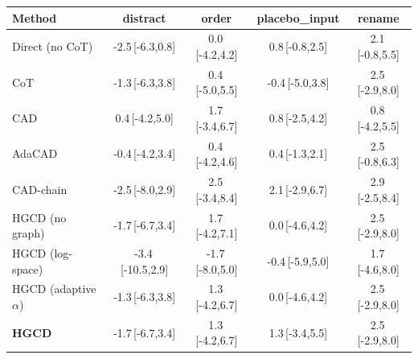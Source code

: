 \begin{tabular}{lcccc}
\toprule
Method & distract & order & placebo\_input & rename \\
\midrule
Direct (no CoT) & -2.5\,{\scriptsize[-6.3,0.8]} & 0.0\,{\scriptsize[-4.2,4.2]} & 0.8\,{\scriptsize[-0.8,2.5]} & 2.1\,{\scriptsize[-0.8,5.5]} \\
CoT & -1.3\,{\scriptsize[-6.3,3.8]} & 0.4\,{\scriptsize[-5.0,5.5]} & -0.4\,{\scriptsize[-5.0,3.8]} & 2.5\,{\scriptsize[-2.9,8.0]} \\
CAD & 0.4\,{\scriptsize[-4.2,5.0]} & 1.7\,{\scriptsize[-3.4,6.7]} & 0.8\,{\scriptsize[-2.5,4.2]} & 0.8\,{\scriptsize[-4.2,5.5]} \\
AdaCAD & -0.4\,{\scriptsize[-4.2,3.4]} & 0.4\,{\scriptsize[-4.2,4.6]} & 0.4\,{\scriptsize[-1.3,2.1]} & 2.5\,{\scriptsize[-0.8,6.3]} \\
CAD-chain & -2.5\,{\scriptsize[-8.0,2.9]} & 2.5\,{\scriptsize[-3.4,8.4]} & 2.1\,{\scriptsize[-2.9,6.7]} & 2.9\,{\scriptsize[-2.5,8.4]} \\
HGCD (no graph) & -1.7\,{\scriptsize[-6.7,3.4]} & 1.7\,{\scriptsize[-4.2,7.1]} & 0.0\,{\scriptsize[-4.6,4.2]} & 2.5\,{\scriptsize[-2.9,8.0]} \\
HGCD (log-space) & -3.4\,{\scriptsize[-10.5,2.9]} & -1.7\,{\scriptsize[-8.0,5.0]} & -0.4\,{\scriptsize[-5.9,5.0]} & 1.7\,{\scriptsize[-4.6,8.0]} \\
HGCD (adaptive $\alpha$) & -1.3\,{\scriptsize[-6.3,3.8]} & 1.3\,{\scriptsize[-4.2,6.7]} & 0.0\,{\scriptsize[-4.6,4.2]} & 2.5\,{\scriptsize[-2.9,8.0]} \\
\textbf{HGCD} & -1.7\,{\scriptsize[-6.7,3.4]} & 1.3\,{\scriptsize[-4.2,6.7]} & 1.3\,{\scriptsize[-3.4,5.5]} & 2.5\,{\scriptsize[-2.9,8.0]} \\
\bottomrule
\end{tabular}
